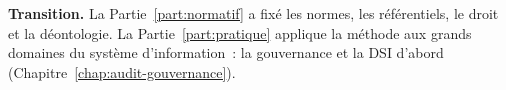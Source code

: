 \begin{boxinfo}
\textbf{Transition.} La Partie~\ref{part:normatif} a fixé les normes, les
référentiels, le droit et la déontologie. La Partie~\ref{part:pratique}
applique la méthode aux grands domaines du système d'information~: la
gouvernance et la DSI d'abord (Chapitre~\ref{chap:audit-gouvernance}).
\end{boxinfo}
